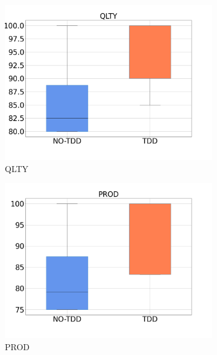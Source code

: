 \begin{figure}[H]
    \centering
    \begin{subfigure}{0.33\textwidth}
        \includegraphics[width=\linewidth]{figures/box_plots/task3/QLTY.png}
        \caption{QLTY}
        \label{bp_task3_prod}
    \end{subfigure}\hfil
        \begin{subfigure}{0.33\textwidth}
        \includegraphics[width=\linewidth]{figures/box_plots/task3/PROD.png}
        \caption{PROD}
        \label{bp_task3_prod}
    \end{subfigure}\hfil
    \begin{subfigure}{0.33\textwidth}

\end{subfigure}
\end{figure}
